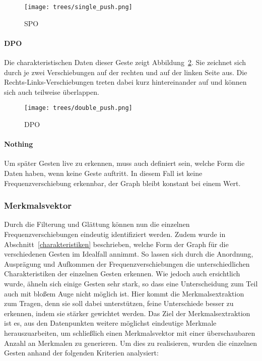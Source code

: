 \begin{figure}[htb] \centering
\texttt{[image: trees/single\_push.png]}
\caption{\acl{SPO}}
\label{fig:single_push}
\end{figure}

\paragraph*{\acl{DPO}}
Die charakteristischen Daten dieser Geste zeigt Abbildung~\ref{fig:double_push}. Sie zeichnet sich durch je zwei Verschiebungen auf der rechten und auf der linken Seite aus. Die Rechts-Links-Verschiebungen treten dabei kurz hintereinander auf und können sich auch teilweise überlappen. 

\begin{figure}[h] \centering
\texttt{[image: trees/double\_push.png]}
\caption{\acl{DPO}}
\label{fig:double_push}
\end{figure}

\paragraph*{Nothing}
Um später Gesten live zu erkennen, muss auch definiert sein, welche Form die Daten haben, wenn keine Geste auftritt. In diesem Fall ist keine Frequenzverschiebung erkennbar, der Graph bleibt konstant bei einem Wert. 

\subsubsection{Merkmalsvektor}
Durch die Filterung und Glättung können nun die einzelnen Frequenzverschiebungen eindeutig identifiziert werden. Zudem wurde in Abschnitt~\ref{charakteristiken} beschrieben, welche Form der Graph für die verschiedenen Gesten im Idealfall annimmt. So lassen sich durch die Anordnung, Ausprägung und Aufkommen der Frequenzverschiebungen die unterschiedlichen Charakteristiken der einzelnen Gesten erkennen. Wie jedoch auch ersichtlich wurde, ähneln sich einige Gesten sehr stark, so dass eine Unterscheidung zum Teil auch mit bloßem Auge nicht möglich ist. Hier kommt die Merkmalsextraktion zum Tragen, denn sie soll dabei unterstützen, feine Unterschiede besser zu erkennen, indem sie stärker gewichtet werden. Das Ziel der Merkmalsextraktion ist es, aus den Datenpunkten weitere möglichst eindeutige Merkmale herauszuarbeiten, um schließlich einen Merkmalsvektor mit einer überschaubaren Anzahl an Merkmalen zu generieren. Um dies zu realisieren, wurden die einzelnen Gesten anhand der folgenden Kriterien analysiert:

